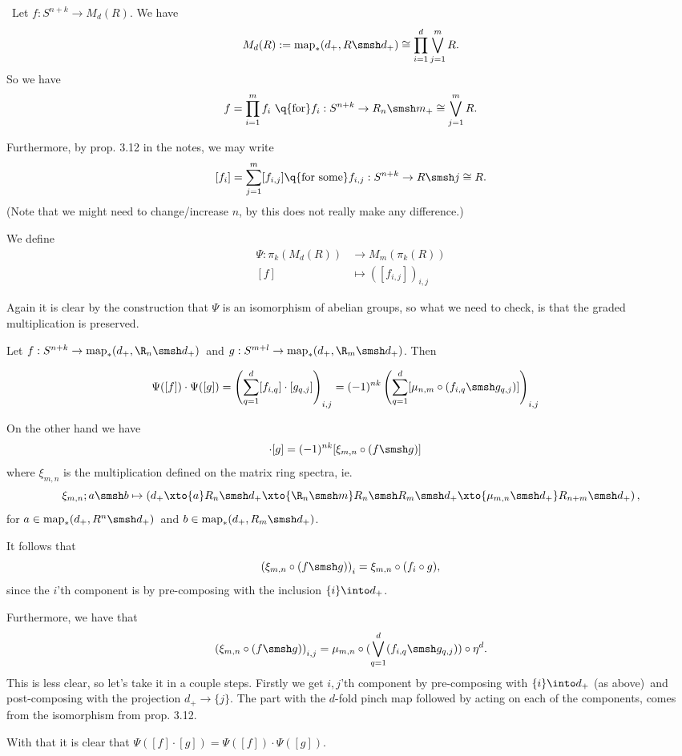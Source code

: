 \begin{exercise}[4]\ 
Let $f : S^{n+k} \to M_d(R)$. 
We have 
\[ M_d(R) := \map_*(d_+, R \smsh d_+) \cong \prod_{i=1}^{d}
\bigvee_{j=1}^{m} R. \] 
So we have
\[ f = \prod_{i=1}^m f_i \q{\text{for}} f_i : S^{n+k} \to R_n \smsh m_+ \cong \bigvee_{j=1}^{m} R.  \]

Furthermore, by prop. 3.12 in the notes, we may write 
\[ [f_i] = \sum_{j=1}^m [f_{i,j}] \q{\text{for some}} f_{i,j} : S^{n+k} \to R
\smsh j \cong R. \]
(Note that we might need to change/increase $n$, by this does not really make any
difference.) 

We define 
\begin{align*}
\Psi : \pi_k(M_d(R)) &\to M_m(\pi_k(R)) \\
[f] &\mapsto ([f_{i,j}])_{i,j}
\end{align*}

Again it is clear by the construction that $\Psi$ is an isomorphism of abelian
groups, so what we need to check, is that the graded multiplication is
preserved.

Let $f : S^{n+k} \to \map_*(d_+, \R_n\smsh d_+)$ and
$g : S^{m+l} \to \map_*(d_+, \R_m\smsh d_+)$. Then 

\begin{align*}
\Psi([f])\cdot \Psi([g]) &= \left(
\sum_{q=1}^d [f_{i,q}] \cdot [g_{q,j}] 
\right)_{i,j} 
= (-1)^{nk} \left(
\sum_{q=1}^d [\mu_{n,m} \circ (f_{i,q} \smsh g_{q,j})] 
\right)_{i,j}
\end{align*}

On the other hand we have 
\begin{align*}
[f] \cdot [g] &= (-1)^{nk} [\xi_{m,n} \circ (f \smsh g)]
\end{align*}
where $\xi_{m,n}$ is the multiplication defined on the matrix ring spectra, ie.
\[ \xi_{m,n}; a\smsh b \mapsto \left(d_+ \xto{a} R_n \smsh d_+ \xto{\R_n \smsh m} R_n
\smsh R_m \smsh d_+ \xto{\mu_{m,n}\smsh d_+} R_{n+m} \smsh d_+ \right), \]
for $a \in \map_*(d_+, R^n \smsh d_+)$ and $b \in \map_*(d_+,R_m\smsh d_+)$.

It follows that 
\[ \left(\xi_{m,n} \circ (f\smsh g) \right)_i = \xi_{m,n} \circ (f_i \circ g), \]
since the $i$'th component is by pre-composing with the inclusion $\{i\} \into d_+$.

Furthermore, we have that 
\[ \left(\xi_{m,n} \circ (f\smsh g)\right)_{i,j} = \mu_{m,n} \circ
(\bigvee_{q=1}^d (f_{i,q}\smsh g_{q,j})) \circ \eta^d.  \]
This is less clear, so let's take it in a couple steps. 
Firstly we get $i,j$'th component by pre-composing with $\{i\} \into d_+$ (as
above) and post-composing with the projection $d_+ \to \{j\}$. 
The part with the $d$-fold pinch map followed by acting on each of the
components, comes from the isomorphism from prop. 3.12.

With that it is clear that $\Psi([f]\cdot [g]) = \Psi([f]) \cdot \Psi([g])$. 
\end{exercise}





